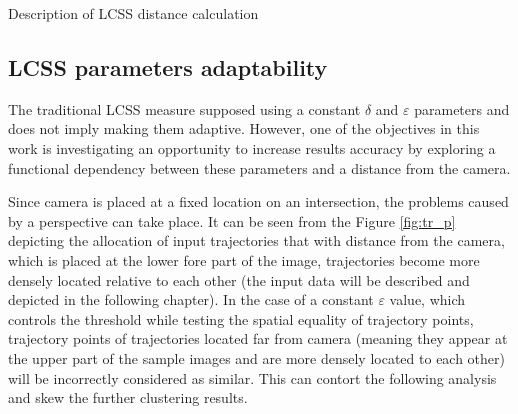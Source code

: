 \begin{algorithm}[!htb]
	\caption{Description of LCSS distance calculation}
	\label{algo:lcss-descr}
	\SetAlgoLined
\end{algorithm}

\subsection{LCSS parameters adaptability}

The traditional LCSS measure supposed using a constant $\delta$ and $\varepsilon$ parameters and does not imply making them adaptive. However, one of the objectives in this work is investigating an opportunity to increase results accuracy by exploring a functional dependency between these parameters and a distance from the camera. 

Since camera is placed at a fixed location on an intersection, the problems caused by a perspective can take place. It can be seen from the Figure \ref{fig:tr_p} depicting the allocation of input trajectories that with distance from the camera, which is placed at the lower fore part of the image, trajectories become more densely located relative to each other (the input data will be described and depicted in the following chapter). In the case of a constant $\varepsilon$ value, which controls the threshold while testing the spatial equality of trajectory points, trajectory points of trajectories located far from camera (meaning they appear at the upper part of the sample images and are more densely located to each other) will be incorrectly considered as similar. This can contort the following analysis and skew the further clustering results.

